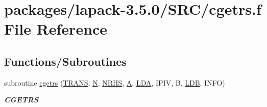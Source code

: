 \hypertarget{cgetrs_8f}{}\section{packages/lapack-\/3.5.0/\+S\+R\+C/cgetrs.f File Reference}
\label{cgetrs_8f}
\subsection*{Functions/\+Subroutines}
\begin{DoxyCompactItemize}
\item 
subroutine \hyperlink{group__complexGEcomputational_ga3a79ef0038488e420519c422c1a2a8f2}{cgetrs} (\hyperlink{superlu__enum__consts_8h_a0c4e17b2d5cea33f9991ccc6a6678d62a1f61e3015bfe0f0c2c3fda4c5a0cdf58}{T\+R\+A\+N\+S}, \hyperlink{polmisc_8c_a0240ac851181b84ac374872dc5434ee4}{N}, \hyperlink{example__user_8c_aa0138da002ce2a90360df2f521eb3198}{N\+R\+H\+S}, \hyperlink{classA}{A}, \hyperlink{example__user_8c_ae946da542ce0db94dced19b2ecefd1aa}{L\+D\+A}, I\+P\+I\+V, B, \hyperlink{example__user_8c_a50e90a7104df172b5a89a06c47fcca04}{L\+D\+B}, I\+N\+F\+O)
\begin{DoxyCompactList}\small\item\em {\bfseries C\+G\+E\+T\+R\+S} \end{DoxyCompactList}\end{DoxyCompactItemize}
